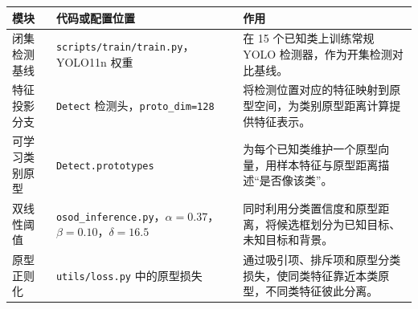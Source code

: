 \setlength{\tabcolsep}{4pt}
\begin{tabular}{p{2.8cm}p{4.9cm}p{5.9cm}}
\toprule
模块 & 代码或配置位置 & 作用 \\
\midrule
闭集检测基线 & \texttt{scripts/train/train.py}，YOLO11n 权重 & 在 15 个已知类上训练常规 YOLO 检测器，作为开集检测对比基线。\\
特征投影分支 & \texttt{Detect} 检测头，\texttt{proto\_dim=128} & 将检测位置对应的特征映射到原型空间，为类别原型距离计算提供特征表示。\\
可学习类别原型 & \texttt{Detect.prototypes} & 为每个已知类维护一个原型向量，用样本特征与原型距离描述“是否像该类”。\\
双线性阈值 & \texttt{osod\_inference.py}，$\alpha=0.37$，$\beta=0.10$，$\delta=16.5$ & 同时利用分类置信度和原型距离，将候选框划分为已知目标、未知目标和背景。\\
原型正则化 & \texttt{utils/loss.py} 中的原型损失 & 通过吸引项、排斥项和原型分类损失，使同类特征靠近本类原型，不同类特征彼此分离。\\
\bottomrule
\end{tabular}
